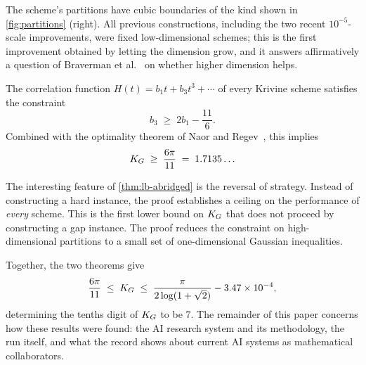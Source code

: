 The scheme's partitions have cubic boundaries of the kind shown in \cref{fig:partitions} (right).
All previous constructions, including the two recent $10^{-5}$-scale improvements, were fixed low-dimensional schemes; this is the first improvement obtained by letting the dimension grow, and it answers affirmatively a question of Braverman et al.~\cite{braverman2011grothendieckconstantstrictlysmaller} on whether higher dimension helps.

\begin{theorem}
\label{thm:lb-abridged}
The correlation function $H(t)=b_1t+b_3t^3+\cdots$ of every Krivine scheme satisfies the constraint
\begin{equation}
\label{eq:affine-coefficient-inequality}
    b_3 \;\ge\; 2b_1-\frac{11}{6}.
\end{equation}
Combined with the optimality theorem of Naor and Regev~\cite{naor2014krivine}, this implies
\[
    K_G \;\ge\; \frac{6\pi}{11} \;=\; 1.7135\ldots
\]
\end{theorem}

The interesting feature of \cref{thm:lb-abridged} is the reversal of strategy.
Instead of constructing a hard instance, the proof establishes a ceiling on the performance of \emph{every} scheme. 
This is the first lower bound on $K_G$ that does not proceed by constructing a gap instance.
The proof reduces the constraint on high-dimensional partitions to a small set of one-dimensional Gaussian inequalities.

Together, the two theorems give
\[
    \frac{6\pi}{11}
    \;\le\;
    K_G
    \;\le\;
    \frac{\pi}{2\log(1+\sqrt2)} - 3.47\times10^{-4},
\]
determining the tenths digit of $K_G$ to be $7$.
The remainder of this paper concerns how these results were found: the AI research system and its methodology, the run itself, and what the record shows about current AI systems as mathematical collaborators.
